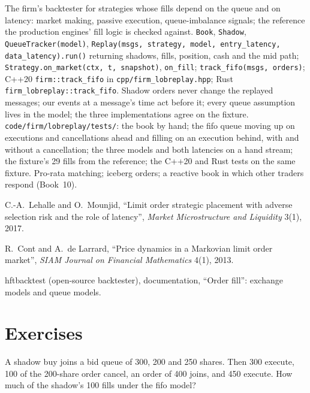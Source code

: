 \begin{build}
 The firm's backtester for strategies whose fills depend on the queue and on latency: market making, passive execution, queue-imbalance
signals; the reference the production engines' fill logic is checked against.
 \texttt{Book}, \texttt{Shadow}, \texttt{QueueTracker(model)}, \texttt{Replay(msgs, strategy, model, entry\_latency, data\_latency).run()}
returning shadows, fills, position, cash and the mid path; \texttt{Strategy.on\_market(ctx, t, snapshot)}, \texttt{on\_fill}; \texttt{track\_fifo(msgs,
orders)}; C++20 \texttt{firm::track\_fifo} in \texttt{cpp/firm\_lobreplay.hpp}; Rust \texttt{firm\_lobreplay::track\_fifo}.
 Shadow orders never change the replayed messages; our events at a message's time act before it; every queue assumption lives in the model;
the three implementations agree on the fixture.
 \texttt{code/firm/lobreplay/tests/}: the book by hand; the fifo queue moving up on executions and cancellations ahead and filling on
an execution behind, with and without a cancellation; the three models and both latencies on a hand stream; the fixture's 29 fills from the reference;
the C++20 and Rust tests on the same fixture.
 Pro-rata matching; iceberg orders; a reactive book in which other traders respond (Book~10).
\end{build}

\begin{omsources}
\item C.-A.~Lehalle and O.~Mounjid, ``Limit order strategic placement with adverse selection risk and the role of latency'', \emph{Market Microstructure and
Liquidity} 3(1), 2017.
\item R.~Cont and A.~de Larrard, ``Price dynamics in a Markovian limit order market'', \emph{SIAM Journal on Financial Mathematics} 4(1), 2013.
\item hftbacktest (open-source backtester), documentation, ``Order fill'': exchange models and queue models.
\end{omsources}

\section{Exercises}

\begin{exercise}[$\star$]\label{exo:rs:order-book-replay-simulation:1}
A shadow buy joins a bid queue of 300, 200 and 250 shares. Then 300 execute, 100 of the 200-share order cancel, an order of 400 joins, and 450 execute. How
much of the shadow's 100 fills under the fifo model?
\end{exercise}

